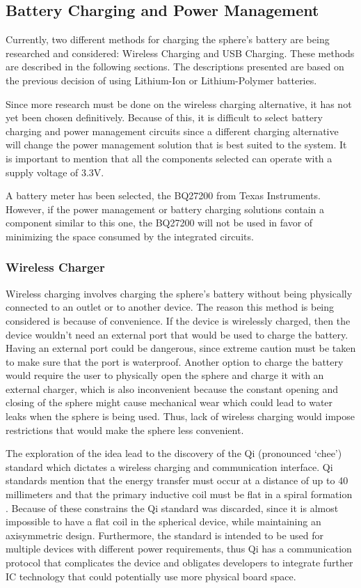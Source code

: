 \subsection{Battery Charging and Power Management}
\label{sec:chargingMethods}
Currently, two different methods for charging the sphere's battery are being researched and considered: Wireless Charging and USB Charging.  These methods are described in the following sections.  The descriptions presented are based on the previous decision of using Lithium-Ion or Lithium-Polymer batteries.

Since more research must be done on the wireless charging alternative, it has not yet been chosen definitively.  Because of this, it is difficult to select battery charging and power management circuits since a different charging alternative will change the power management solution that is best suited to the system.  It is important to mention that all the components selected can operate with a supply voltage of 3.3V.

A battery meter has been selected, the BQ27200 from Texas Instruments.  However, if the power management or battery charging solutions contain a component similar to this one, the BQ27200 will not be used in favor of minimizing the space consumed by the integrated circuits.

\subsubsection{Wireless Charger}
Wireless charging involves charging the sphere's battery without being physically connected to an outlet or to another device. The reason this method is being considered is because of convenience. If the device is wirelessly charged, then the device wouldn't need an external port that would be used to charge the battery. Having an external port could be dangerous, since extreme caution must be taken to make sure that the port is waterproof. Another option to charge the battery would require the user to physically open the sphere and charge it with an external charger, which is also inconvenient because the constant opening and closing of the sphere might cause mechanical wear which could lead to water leaks when the sphere is being used. Thus, lack of wireless charging would impose restrictions that would make the sphere less convenient.

The exploration of the idea lead to the discovery of the Qi (pronounced `chee') standard which dictates a wireless charging and communication interface. Qi standards mention that the energy transfer must occur at a distance of up to 40 millimeters and that the primary inductive coil must be flat in a spiral formation \cite{QiStandard}. Because of these constrains the Qi standard was discarded, since it is almost impossible to have a flat coil in the spherical device, while maintaining an axisymmetric design. Furthermore, the standard is intended to be used for multiple devices with different power requirements, thus Qi has a communication protocol that complicates the device and obligates developers to integrate further IC technology that could potentially use more physical board space. 

